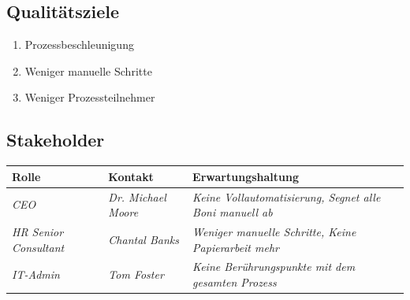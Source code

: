 \documentclass[]{article}
\begin{document}
\hypertarget{_qualit_tsziele}{%
\subsection{Qualitätsziele}\label{_qualit_tsziele}}

\begin{enumerate}
\item Prozessbeschleunigung
\item Weniger manuelle Schritte
\item Weniger Prozessteilnehmer
\end{enumerate}


\hypertarget{_stakeholder}{%
\subsection{Stakeholder}\label{_stakeholder}}

\begin{longtable}[]{@{}lll@{}}
\toprule
\begin{minipage}[b]{0.23\columnwidth}\raggedright
Rolle\strut
\end{minipage} & \begin{minipage}[b]{0.23\columnwidth}\raggedright
Kontakt\strut
\end{minipage} & \begin{minipage}[b]{0.46\columnwidth}\raggedright
Erwartungshaltung\strut
\end{minipage}\tabularnewline
\midrule
\endhead
\begin{minipage}[t]{0.23\columnwidth}\raggedright
	\emph{CEO}\strut
\end{minipage} & \begin{minipage}[t]{0.23\columnwidth}\raggedright
\emph{Dr. Michael Moore}\strut
\end{minipage} & \begin{minipage}[t]{0.46\columnwidth}\raggedright
\emph{Keine Vollautomatisierung, Segnet alle Boni manuell ab}\strut
\end{minipage}\tabularnewline
\begin{minipage}[t]{0.23\columnwidth}\raggedright
\emph{HR Senior Consultant}\strut
\end{minipage} & \begin{minipage}[t]{0.23\columnwidth}\raggedright
\emph{Chantal Banks}\strut
\end{minipage} & \begin{minipage}[t]{0.46\columnwidth}\raggedright
\emph{Weniger manuelle Schritte, Keine Papierarbeit mehr}\strut
\end{minipage}\tabularnewline
\begin{minipage}[t]{0.23\columnwidth}\raggedright
	\emph{IT-Admin}\strut
\end{minipage} & \begin{minipage}[t]{0.23\columnwidth}\raggedright
	\emph{Tom Foster}\strut
\end{minipage} & \begin{minipage}[t]{0.46\columnwidth}\raggedright
	\emph{Keine Berührungspunkte mit dem gesamten Prozess}\strut
\end{minipage}\tabularnewline
\bottomrule
\end{longtable}
\end{document}
